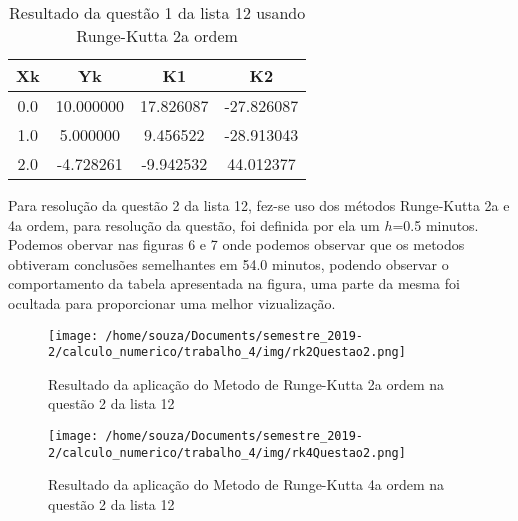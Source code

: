 \documentclass[12pt]{article}
\begin{document}
\begin{table}[!h]
    \centering
\begin{tabular}{c|c|c|c|}
\textbf{Xk} & \textbf{Yk} & \textbf{K1} & \textbf{K2} \\ \hline
0.0         & 10.000000   & 17.826087   & -27.826087  \\
1.0         & 5.000000    & 9.456522    & -28.913043  \\
2.0         & -4.728261   & -9.942532   & 44.012377   \\ \hline
\end{tabular}
    \caption{Resultado da questão 1 da lista 12 usando Runge-Kutta 2a ordem}
\end{table}


Para resolução da questão 2 da lista 12, fez-se uso dos métodos Runge-Kutta 2a e 4a ordem, para resolução da questão, foi definida por ela um $h$=0.5 minutos. Podemos obervar nas figuras 6 e 7 onde podemos observar que os metodos obtiveram conclusões semelhantes em 54.0 minutos, podendo observar o comportamento da tabela apresentada na figura, uma parte da mesma foi ocultada para proporcionar uma melhor vizualização.


\begin{figure}[!h]
    \centering
    \texttt{[image: /home/souza/Documents/semestre\_2019-2/calculo\_numerico/trabalho\_4/img/rk2Questao2.png]}
    \caption{Resultado da aplicação do Metodo de Runge-Kutta 2a ordem na questão 2 da lista 12}
\end{figure}



\begin{figure}[!h]
    \centering
    \texttt{[image: /home/souza/Documents/semestre\_2019-2/calculo\_numerico/trabalho\_4/img/rk4Questao2.png]}
    \caption{Resultado da aplicação do Metodo de Runge-Kutta 4a ordem na questão 2 da lista 12}
\end{figure}
\end{document}

